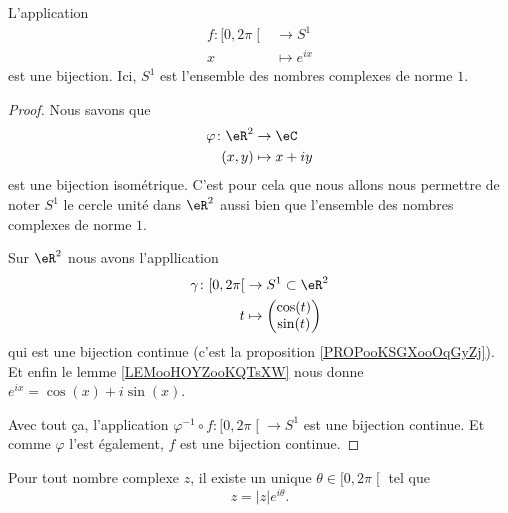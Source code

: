 \begin{proposition}     \label{PROPooZEFEooEKMOPT}
    L'application
    \begin{equation}
        \begin{aligned}
            f\colon \mathopen[ 0 , 2\pi \mathclose[&\to S^1 \\
                x&\mapsto  e^{ix} 
        \end{aligned}
    \end{equation}
    est une bijection. Ici, \( S^1\) est l'ensemble des nombres complexes de norme \( 1\).
\end{proposition}

\begin{proof}
    Nous savons que
    \begin{equation}
        \begin{aligned}
            \varphi\colon \eR^2&\to \eC \\
            (x,y)&\mapsto x+iy 
        \end{aligned}
    \end{equation}
    est une bijection isométrique. C'est pour cela que nous allons nous permettre de noter \( S^1\) le cercle unité dans \( \eR^2\) aussi bien que l'ensemble des nombres complexes de norme \( 1\). 
    
    Sur \( \eR^2\) nous avons l'appllication
    \begin{equation}
        \begin{aligned}
            \gamma\colon \mathopen[ 0 , 2\pi \mathclose[&\to S^1\subset \eR^2 \\
                t&\mapsto \begin{pmatrix}
                    \cos(t)    \\ 
                    \sin(t)    
                \end{pmatrix}
        \end{aligned}
    \end{equation}
    qui est une bijection continue (c'est la proposition \ref{PROPooKSGXooOqGyZj}). Et enfin le lemme \ref{LEMooHOYZooKQTsXW} nous donne \(  e^{ix}=\cos(x)+i\sin(x)\).

    Avec tout ça, l'application \( \varphi^{-1}\circ f\colon \mathopen[ 0 , 2\pi \mathclose[\to S^1 \) est une bijection continue. Et comme \( \varphi\) l'est également, \( f\) est une bijection continue.
\end{proof}

\begin{proposition}     \label{PROPooRFMKooURhAQJ}
    Pour tout nombre complexe \( z\), il existe un unique \( \theta\in\mathopen[ 0 , 2\pi \mathclose[\) tel que
        \begin{equation}
            z=| z | e^{i\theta}.
        \end{equation}
\end{proposition}

